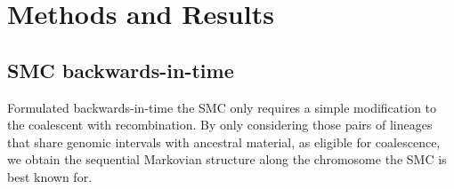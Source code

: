 \documentclass{article}
\begin{document}








\section{Methods and Results}
\subsection{SMC backwards-in-time}\label{par:description}

Formulated backwards-in-time the SMC \citep{mcvean_approximating_2005} only requires a simple modification to the 
coalescent with recombination. By only considering those pairs of 
lineages that share 
genomic intervals with ancestral material, as eligible for coalescence, we obtain the 
sequential Markovian structure along the chromosome the SMC is best known for.\\
\end{document}
